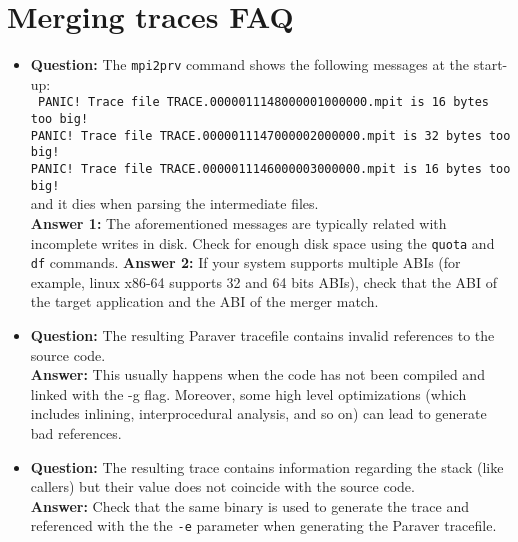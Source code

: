 \section{Merging traces FAQ}

\begin{itemize}

\item {\bf Question:} The {\tt mpi2prv} command shows the following messages at the start-up:\\
      {\tt
      PANIC! Trace file TRACE.0000011148000001000000.mpit is 16 bytes too big!\\
      PANIC! Trace file TRACE.0000011147000002000000.mpit is 32 bytes too big!\\
      PANIC! Trace file TRACE.0000011146000003000000.mpit is 16 bytes too big!\\
      }
      and it dies when parsing the intermediate files.\\
      {\bf Answer  1:} The aforementioned messages are typically related with incomplete writes in disk. Check for enough disk space using the {\tt quota} and {\tt df} commands.
      {\bf Answer  2:} If your system supports multiple ABIs (for example, linux x86-64 supports 32 and 64 bits ABIs), check that the ABI of the target application and the ABI of the merger match.

\item {\bf Question:} The resulting Paraver tracefile contains invalid references to the source code.\\
      {\bf Answer:  } This usually happens when the code has not been compiled and linked with the -g flag. Moreover, some high level optimizations (which includes inlining, interprocedural analysis, and so on) can lead to generate bad references.

\item {\bf Question:} The resulting trace contains information regarding the stack (like callers) but their value does not coincide with the source code.\\
      {\bf Answer:  } Check that the same binary is used to generate the trace and referenced with the the {\tt -e} parameter when generating the Paraver tracefile.

\end{itemize}
